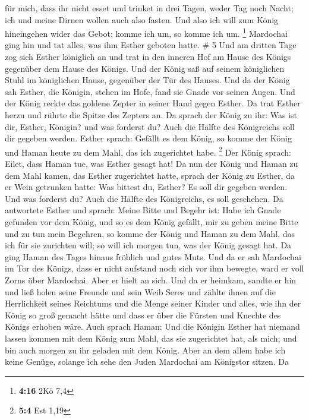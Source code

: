 für mich, dass ihr nicht esset und trinket in drei Tagen, weder Tag noch
Nacht; ich und meine Dirnen wollen auch also fasten. Und also ich will
zum König hineingehen wider das Gebot; komme ich um, so komme ich um.
\footnote{\textbf{4:16} 2Kö 7,4}  Mardochai ging hin und
tat alles, was ihm Esther geboten hatte. \# 5  Und am
dritten Tage zog sich Esther königlich an und trat in den inneren Hof am
Hause des Königs gegenüber dem Hause des Königs. Und der König saß auf
seinem königlichen Stuhl im königlichen Hause, gegenüber der Tür des
Hauses.  Und da der König sah Esther, die Königin, stehen
im Hofe, fand sie Gnade vor seinen Augen. Und der König reckte das
goldene Zepter in seiner Hand gegen Esther. Da trat Esther herzu und
rührte die Spitze des Zepters an.  Da sprach der König zu
ihr: Was ist dir, Esther, Königin? und was forderst du? Auch die Hälfte
des Königreichs soll dir gegeben werden.  Esther sprach:
Gefällt es dem König, so komme der König und Haman heute zu dem Mahl,
das ich zugerichtet habe. \footnote{\textbf{5:4} Est 1,19}
 Der König sprach: Eilet, dass Haman tue, was Esther
gesagt hat! Da nun der König und Haman zu dem Mahl kamen, das Esther
zugerichtet hatte,  sprach der König zu Esther, da er Wein
getrunken hatte: Was bittest du, Esther? Es soll dir gegeben werden. Und
was forderst du? Auch die Hälfte des Königreichs, es soll geschehen.
 Da antwortete Esther und sprach: Meine Bitte und Begehr
ist:  Habe ich Gnade gefunden vor dem König, und so es dem
König gefällt, mir zu geben meine Bitte und zu tun mein Begehren, so
komme der König und Haman zu dem Mahl, das ich für sie zurichten will;
so will ich morgen tun, was der König gesagt hat.  Da ging
Haman des Tages hinaus fröhlich und gutes Muts. Und da er sah Mardochai
im Tor des Königs, dass er nicht aufstand noch sich vor ihm bewegte,
ward er voll Zorns über Mardochai.  Aber er hielt an
sich. Und da er heimkam, sandte er hin und ließ holen seine Freunde und
sein Weib Seres  und zählte ihnen auf die Herrlichkeit
seines Reichtums und die Menge seiner Kinder und alles, wie ihn der
König so groß gemacht hätte und dass er über die Fürsten und Knechte des
Königs erhoben wäre.  Auch sprach Haman: Und die Königin
Esther hat niemand lassen kommen mit dem König zum Mahl, das sie
zugerichtet hat, als mich; und bin auch morgen zu ihr geladen mit dem
König.  Aber an dem allem habe ich keine Genüge, solange
ich sehe den Juden Mardochai am Königstor sitzen.  Da
